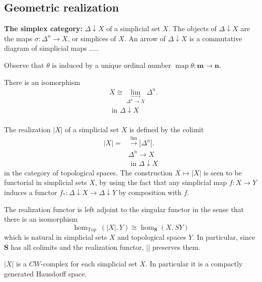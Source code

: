 \subsection*{Geometric realization}

\textbf{The simplex category:} $\Delta \downarrow X$ of a simplicial set $X$. The objects of $\Delta \downarrow X$ are the maps $\sigma: \Delta^n \rightarrow X$, or simplices of $X$. An arrow of $\Delta \downarrow X$ is a commutative diagram of simplicial maps .....

Observe that $\theta$ is induced by a unique ordinal number $\operatorname{map} \theta: \mathbf{m} \rightarrow \mathbf{n}$.
\begin{lemm} There is an isomorphism
$$
\begin{aligned}
& X \cong \underset{\Delta^n \longrightarrow X}{\lim _{\longrightarrow}} \Delta^n . \\
& \text { in } \Delta \downarrow X \\
&
\end{aligned}
$$
\end{lemm}

The realization $|X|$ of a simplicial set $X$ is defined by the colimit
$$
\begin{aligned}
|X|= & \xrightarrow{\lim }\left|\Delta^n\right| . \\
& \Delta^n \rightarrow X \\
& \text { in } \Delta \downarrow X
\end{aligned}
$$
in the category of topological spaces. The construction $X \mapsto|X|$ is seen to be functorial in simplicial sets $X$, by using the fact that any simplicial map $f: X \rightarrow Y$ induces a functor $f_*: \Delta \downarrow X \rightarrow \Delta \downarrow Y$ by composition with $f$.

\begin{prop}
    The realization functor is left adjoint to the singular functor in the sense that there is an isomorphism
$$
\operatorname{hom}_{\text {Top }}(|X|, Y) \cong \operatorname{hom}_{\mathbf{S}}(X, S Y)
$$
which is natural in simplicial sets $X$ and topological spaces $Y$. In particular, since $\mathbf{S}$ has all colimits and the realization functor, || preserves them.
\end{prop} 

\begin{prop}
    $|X|$ is a $C W$-complex for each simplicial set $X$. In particular it is a compactly generated Hausdorff space.
\end{prop}


